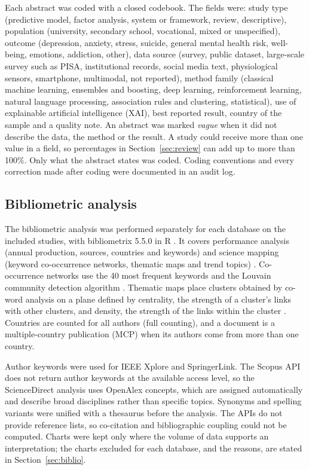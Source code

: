 \documentclass[11pt,a4paper]{article}
\begin{document}
Each abstract was coded with a closed codebook. The fields were: study type (predictive model, factor analysis, system or framework, review, descriptive), population (university, secondary school, vocational, mixed or unspecified), outcome (depression, anxiety, stress, suicide, general mental health risk, well-being, emotions, addiction, other), data source (survey, public dataset, large-scale survey such as PISA, institutional records, social media text, physiological sensors, smartphone, multimodal, not reported), method family (classical machine learning, ensembles and boosting, deep learning, reinforcement learning, natural language processing, association rules and clustering, statistical), use of explainable artificial intelligence (XAI), best reported result, country of the sample and a quality note. An abstract was marked \emph{vague} when it did not describe the data, the method or the result. A study could receive more than one value in a field, so percentages in Section~\ref{sec:review} can add up to more than 100\%. Only what the abstract states was coded. Coding conventions and every correction made after coding were documented in an audit log.

\subsection{Bibliometric analysis}

The bibliometric analysis was performed separately for each database on the included studies, with bibliometrix 5.5.0 in R \cite{aria2017bibliometrix}. It covers performance analysis (annual production, sources, countries and keywords) and science mapping (keyword co-occurrence networks, thematic maps and trend topics) \cite{donthu2021bibliometric}. Co-occurrence networks use the 40 most frequent keywords and the Louvain community detection algorithm \cite{blondel2008louvain}. Thematic maps place clusters obtained by co-word analysis \cite{callon1991coword} on a plane defined by centrality, the strength of a cluster's links with other clusters, and density, the strength of the links within the cluster \cite{cobo2011thematic}. Countries are counted for all authors (full counting), and a document is a multiple-country publication (MCP) when its authors come from more than one country.

Author keywords were used for IEEE Xplore and SpringerLink. The Scopus API does not return author keywords at the available access level, so the ScienceDirect analysis uses OpenAlex concepts, which are assigned automatically and describe broad disciplines rather than specific topics. Synonyms and spelling variants were unified with a thesaurus before the analysis. The APIs do not provide reference lists, so co-citation and bibliographic coupling could not be computed. Charts were kept only where the volume of data supports an interpretation; the charts excluded for each database, and the reasons, are stated in Section~\ref{sec:biblio}.
\end{document}
